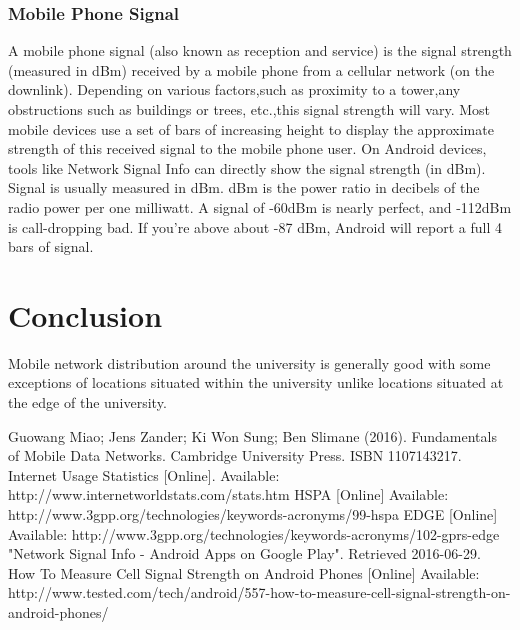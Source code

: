 \documentclass{article}
\begin{document}
			\subsubsection{Mobile Phone Signal}
A mobile phone signal (also known as reception and service) is the signal strength (measured in dBm) received by a mobile phone from a cellular network (on the downlink). Depending on various factors,such as proximity to a tower,any obstructions such as buildings or trees, etc.,this signal strength will vary. Most mobile devices use a set of bars of increasing height to display the approximate strength of this received signal to the mobile phone user.  On Android devices, tools like Network Signal Info\cite{key:5} can directly show the signal strength (in dBm). Signal is usually measured in dBm. dBm is the power ratio in decibels of the radio power per one milliwatt. A signal of -60dBm is nearly perfect, and -112dBm is call-dropping bad. If you're above about -87 dBm, Android will report a full 4 bars of signal.\cite{key:6}

\section{Conclusion}
Mobile network distribution around the university is generally good with some exceptions of locations situated within the university unlike locations situated at the edge of the university.
			
\begin{thebibliography}{9}
Guowang Miao; Jens Zander; Ki Won Sung; Ben Slimane (2016). Fundamentals of Mobile Data Networks. Cambridge University Press. ISBN 1107143217.
Internet Usage Statistics [Online].  Available: http://www.internetworldstats.com/stats.htm
HSPA [Online] Available: http://www.3gpp.org/technologies/keywords-acronyms/99-hspa
EDGE [Online] Available: http://www.3gpp.org/technologies/keywords-acronyms/102-gprs-edge
"Network Signal Info - Android Apps on Google Play". Retrieved 2016-06-29.
How To Measure Cell Signal Strength on Android Phones [Online] Available: http://www.tested.com/tech/android/557-how-to-measure-cell-signal-strength-on-android-phones/
\end{thebibliography}
\end{document}
